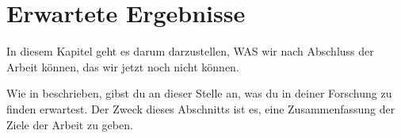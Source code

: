 

\chapter{Erwartete Ergebnisse}

In diesem Kapitel geht es darum darzustellen, WAS wir nach Abschluss der Arbeit können, das wir jetzt noch nicht können.

Wie in \textcite{deeptanshu2022} beschrieben, gibst du an dieser Stelle an, was du in deiner Forschung zu finden erwartest. Der Zweck dieses Abschnitts ist es, eine Zusammenfassung der Ziele der Arbeit zu geben.